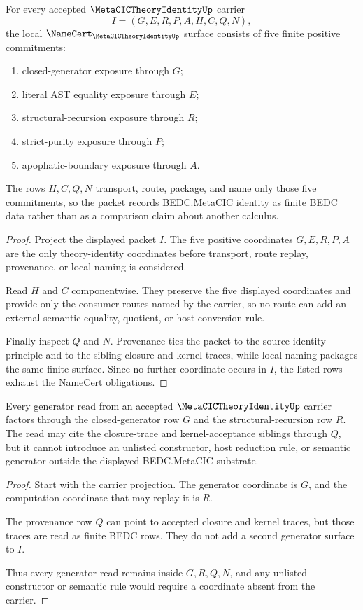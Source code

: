 \begin{theorem}
\label{thm:metacic-theory-identity-namecert-obligations}
For every accepted $\MetaCICTheoryIdentityUp$ carrier
$$
I=(G,E,R,P,A,H,C,Q,N),
$$
the local $\NameCert_{\MetaCICTheoryIdentityUp}$ surface consists of five finite positive commitments:
\begin{enumerate}
\item closed-generator exposure through $G$;
\item literal AST equality exposure through $E$;
\item structural-recursion exposure through $R$;
\item strict-purity exposure through $P$;
\item apophatic-boundary exposure through $A$.
\end{enumerate}
The rows $H,C,Q,N$ transport, route, package, and name only those five commitments, so the packet records BEDC.MetaCIC identity as finite BEDC data rather than as a comparison claim about another calculus.
\end{theorem}
\begin{proof}
Project the displayed packet $I$. The five positive coordinates $G,E,R,P,A$ are the only theory-identity coordinates before transport, route replay, provenance, or local naming is considered.

Read $H$ and $C$ componentwise. They preserve the five displayed coordinates and provide only the consumer routes named by the carrier, so no route can add an external semantic equality, quotient, or host conversion rule.

Finally inspect $Q$ and $N$. Provenance ties the packet to the source identity principle and to the sibling closure and kernel traces, while local naming packages the same finite surface. Since no further coordinate occurs in $I$, the listed rows exhaust the NameCert obligations.
\end{proof}

\begin{theorem}
\label{thm:metacic-theory-identity-closed-generator-scope}
Every generator read from an accepted $\MetaCICTheoryIdentityUp$ carrier factors through the closed-generator row $G$ and the structural-recursion row $R$. The read may cite the closure-trace and kernel-acceptance siblings through $Q$, but it cannot introduce an unlisted constructor, host reduction rule, or semantic generator outside the displayed BEDC.MetaCIC substrate.
\end{theorem}
\begin{proof}
Start with the carrier projection. The generator coordinate is $G$, and the computation coordinate that may replay it is $R$.

The provenance row $Q$ can point to accepted closure and kernel traces, but those traces are read as finite BEDC rows. They do not add a second generator surface to $I$.

Thus every generator read remains inside $G,R,Q,N$, and any unlisted constructor or semantic rule would require a coordinate absent from the carrier.
\end{proof}

